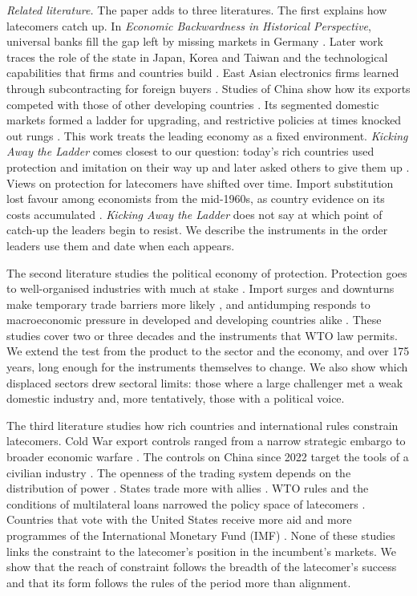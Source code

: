\documentclass[review,authoryear,12pt]{elsarticle}
\begin{document}
\emph{Related literature.} The paper adds to three literatures. The first explains how latecomers catch up. In \emph{Economic Backwardness in Historical Perspective}, universal banks fill the gap left by missing markets in Germany \citep{gerschenkron1962}. Later work traces the role of the state in Japan, Korea and Taiwan \citep{johnson1982,amsden1989,wade1990,evans1995} and the technological capabilities that firms and countries build \citep{lall1992}. East Asian electronics firms learned through subcontracting for foreign buyers \citep{hobday1995}. Studies of China show how its exports competed with those of other developing countries \citep{lall2004,gallagher2008}. Its segmented domestic markets formed a ladder for upgrading, and restrictive policies at times knocked out rungs \citep{brandt2016}. This work treats the leading economy as a fixed environment. \emph{Kicking Away the Ladder} comes closest to our question: today's rich countries used protection and imitation on their way up and later asked others to give them up \citep{chang2002}. Views on protection for latecomers have shifted over time. Import substitution lost favour among economists from the mid-1960s, as country evidence on its costs accumulated \citep{irwin2021}. \emph{Kicking Away the Ladder} does not say at which point of catch-up the leaders begin to resist. We describe the instruments in the order leaders use them and date when each appears.

The second literature studies the political economy of protection. Protection goes to well-organised industries with much at stake \citep{grossman1994}. Import surges and downturns make temporary trade barriers more likely \citep{bown2013aer,bown2013jie}, and antidumping responds to macroeconomic pressure in developed and developing countries alike \citep{aggarwal2004}. These studies cover two or three decades and the instruments that WTO law permits. We extend the test from the product to the sector and the economy, and over 175 years, long enough for the instruments themselves to change. We also show which displaced sectors drew sectoral limits: those where a large challenger met a weak domestic industry and, more tentatively, those with a political voice.

The third literature studies how rich countries and international rules constrain latecomers. Cold War export controls ranged from a narrow strategic embargo to broader economic warfare \citep{mastanduno1985,mastanduno1992}. The controls on China since 2022 target the tools of a civilian industry \citep{lind2025}. The openness of the trading system depends on the distribution of power \citep{krasner1976}. States trade more with allies \citep{gowa1993}. WTO rules and the conditions of multilateral loans narrowed the policy space of latecomers \citep{wade2003,rodrik2006,kentikelenis2016}. Countries that vote with the United States receive more aid and more programmes of the International Monetary Fund (IMF) \citep{thacker1999,barro2005,kuziemko2006,dreher2009eer,dreher2009jde,stubbs2016}. None of these studies links the constraint to the latecomer's position in the incumbent's markets. We show that the reach of constraint follows the breadth of the latecomer's success and that its form follows the rules of the period more than alignment.
\end{document}
